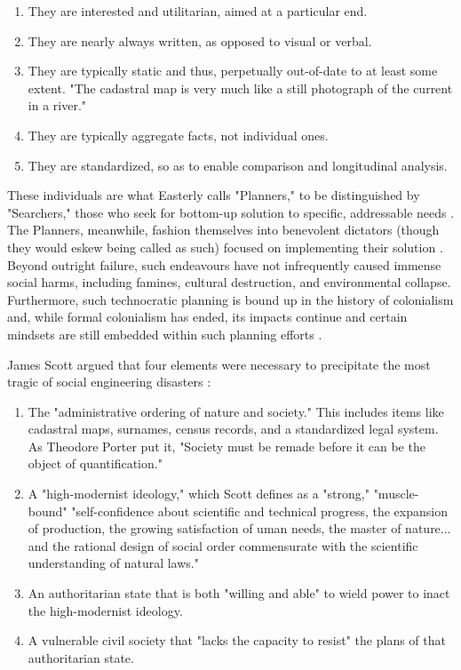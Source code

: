 \begin{enumerate} \setlength{\itemsep}{0pt} \setlength{\parskip}{0pt} 
	\item{They are interested and utilitarian, aimed at a particular end.}
	\item{They are nearly always written, as opposed to visual or verbal.}
	\item{They are typically static and thus, perpetually out-of-date to at least some extent. "The cadastral map is very much like a still photograph of the current in a river."}
	\item{They are typically aggregate facts, not individual ones.}
	\item{They are standardized, so as to enable comparison and longitudinal analysis.}
\end{enumerate}

These individuals are what Easterly calls "Planners," to be distinguished by "Searchers," those who seek for bottom-up solution to specific, addressable needs \cite{easterlyWhiteManBurden2007a}. The Planners, meanwhile, fashion themselves into benevolent dictators (though they would eskew being called as such) focused on implementing their solution \cite{easterly2015}. Beyond outright failure, such endeavours have not infrequently caused immense social harms, including famines, cultural destruction, and environmental collapse. Furthermore, such technocratic planning is bound up in the history of colonialism and, while formal colonialism has ended, its impacts continue and certain mindsets are still embedded within such planning efforts \cite{sandercockCommentaryIndigenousPlanning2004}.

James Scott argued that four elements were necessary to precipitate the most tragic of social engineering disasters \cite{scottSeeingStateHow2020}:

\begin{enumerate} \setlength{\itemsep}{0pt} \setlength{\parskip}{0pt} 
	\item{The "administrative ordering of nature and society." This includes items like cadastral maps, surnames, census records, and a standardized legal system. As Theodore Porter put it, "Society must be remade before it can be the object of quantification." \cite{porter1992objectivity}}
	\item{A "high-modernist ideology," which Scott defines as a "strong," "muscle-bound" "self-confidence about scientific and technical progress, the expansion of production, the growing satisfaction of uman needs, the master of nature... and the rational design of social order commensurate with the scientific understanding of natural laws."}
	\item{An authoritarian state that is both "willing and able" to wield power to inact the high-modernist ideology.}
	\item{A vulnerable civil society that "lacks the capacity to resist" the plans of that authoritarian state.}
\end{enumerate}

